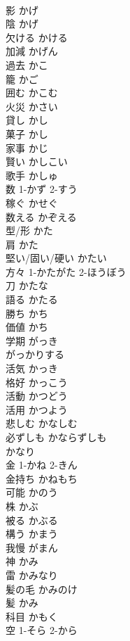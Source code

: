 \documentclass[8pt]{extreport}
\begin{document}
\begin{CJK}{UTF8}{min}
\\	影	かげ	
\\	陰	かげ	
\\	欠ける	かける	
\\	加減	かげん	
\\	過去	かこ	
\\	籠	かご	
\\	囲む	かこむ	
\\	火災	かさい	
\\	貸し	かし	
\\	菓子	かし	
\\	家事	かじ	
\\	賢い	かしこい	
\\	歌手	かしゅ	
\\	数	1-かず 2-すう	
\\	稼ぐ	かせぐ	
\\	数える	かぞえる	
\\	型/形	かた	
\\	肩	かた	
\\	堅い/固い/硬い	かたい	
\\	方々	1-かたがた 2-ほうぼう	
\\	刀	かたな	
\\	語る	かたる	
\\	勝ち	かち	
\\	価値	かち	
\\	学期	がっき	
\\	がっかりする		
\\	活気	かっき	
\\	格好	かっこう	
\\	活動	かつどう	
\\	活用	かつよう	
\\	悲しむ	かなしむ	
\\	必ずしも	かならずしも	
\\	かなり		
\\	金	1-かね 2-きん	
\\	金持ち	かねもち	
\\	可能	かのう	
\\	株	かぶ	
\\	被る	かぶる	
\\	構う	かまう	
\\	我慢	がまん	
\\	神	かみ	
\\	雷	かみなり	
\\	髪の毛	かみのけ	
\\	髪	かみ	
\\	科目	かもく	
\\	空	1-そら 2-から	

\end{CJK}
\end{document}
